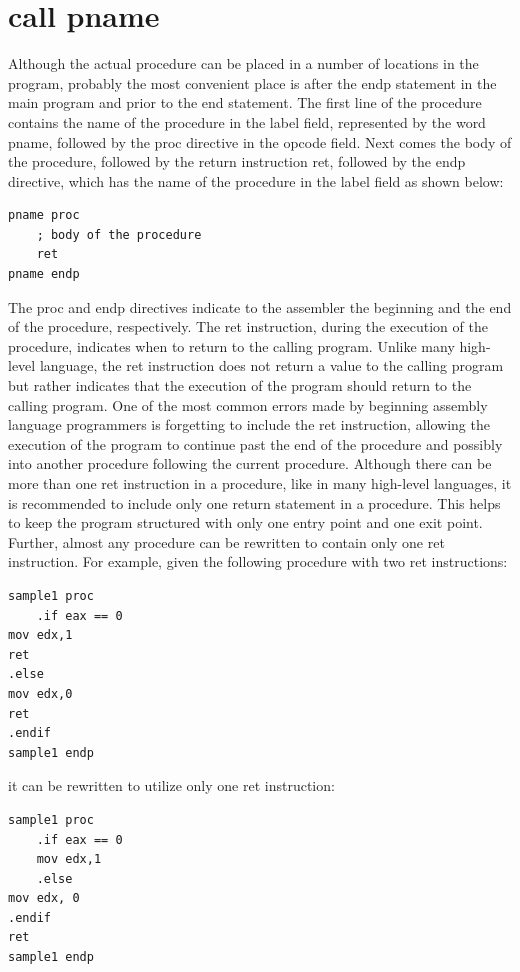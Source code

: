 \documentclass[10pt]{book}
\begin{document}
\section{call pname}
Although the actual procedure can be placed in a number of locations in the program, probably the most convenient place is after the endp statement in the main program and prior to the end statement. The first line of the procedure contains the name of the procedure in the label field, represented by the word pname, followed by the proc directive in the opcode field. Next comes the body of the procedure, followed by the return instruction ret, followed by the endp directive, which has the name of the procedure in the label field as shown below:

\begin{verbatim}
pname proc
    ; body of the procedure
    ret
pname endp
\end{verbatim}

The proc and endp directives indicate to the assembler the beginning and the end of the procedure, respectively. The ret instruction, during the execution of the procedure, indicates when to return to the calling program. Unlike many high-level language, the ret instruction does not return a value to the calling program but rather indicates that the execution of the program should return to the calling program. One of the most common errors made by beginning assembly language programmers is forgetting to include the ret instruction, allowing the execution of the program to continue past the end of the procedure and possibly into another procedure following the current procedure. Although there can be more than one ret instruction in a procedure, like in many high-level languages, it is recommended to include only one return statement in a procedure. This helps to keep the program structured with only one entry point and one exit point. Further, almost any procedure can be rewritten to contain only one ret instruction. For example, given the following procedure with two ret instructions:

\begin{verbatim}
sample1 proc
    .if eax == 0
mov edx,1
ret
.else
mov edx,0
ret
.endif
sample1 endp
\end{verbatim}

it can be rewritten to utilize only one ret instruction:

\begin{verbatim}
sample1 proc
    .if eax == 0
    mov edx,1
    .else
mov edx, 0
.endif
ret
sample1 endp
\end{verbatim}
\end{document}

